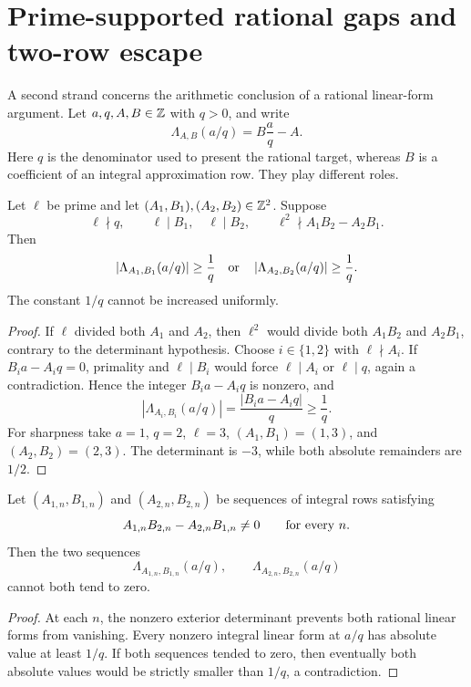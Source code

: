 \documentclass[11pt]{article}
\begin{document}
\section{Prime-supported rational gaps and two-row escape}
\label{sec:prime-support}

A second strand concerns the arithmetic conclusion of a rational linear-form
argument.  Let \(a,q,A,B\in\mathbb{Z}\) with \(q>0\), and
write
\[
  \Lambda_{A,B}(a/q)=B\frac aq-A .
\]
Here \(q\) is the denominator used to present the rational target, whereas
\(B\) is a coefficient of an integral approximation row.  They play different
roles.

\begin{theorem}
\label{res:prime-supported-two-selector-gap}
Let \(\ell\) be prime and let
\((A_1,B_1),(A_2,B_2)\in\mathbb{Z}^2\).  Suppose
\[
 \ell\nmid q,\qquad
 \ell\mid B_1,\quad \ell\mid B_2,\qquad
 \ell^2\nmid A_1B_2-A_2B_1 .
\]
Then
\[
 \left|\Lambda_{A_1,B_1}(a/q)\right|\ge\frac1q
 \quad\hbox{or}\quad
 \left|\Lambda_{A_2,B_2}(a/q)\right|\ge\frac1q .
\]
The constant \(1/q\) cannot be increased uniformly.
\end{theorem}

\begin{proof}
If \(\ell\) divided both \(A_1\) and \(A_2\), then \(\ell^2\) would divide
both \(A_1B_2\) and \(A_2B_1\), contrary to the determinant hypothesis.
Choose \(i\in\{1,2\}\) with \(\ell\nmid A_i\).  If
\(B_i a-A_iq=0\), primality and \(\ell\mid B_i\) would force
\(\ell\mid A_i\) or \(\ell\mid q\), again a contradiction.  Hence the
integer \(B_i a-A_iq\) is nonzero, and
\[
 \left|\Lambda_{A_i,B_i}(a/q)\right|
 =\frac{|B_i a-A_iq|}{q}\ge\frac1q .
\]
For sharpness take \(a=1\), \(q=2\), \(\ell=3\),
\((A_1,B_1)=(1,3)\), and \((A_2,B_2)=(2,3)\).  The determinant is \(-3\),
while both absolute remainders are \(1/2\).
\end{proof}

\begin{corollary}
\label{res:rational-two-selector-no-double-decay}
Let \((A_{1,n},B_{1,n})\) and \((A_{2,n},B_{2,n})\) be sequences of integral
rows satisfying
\[
 A_{1,n}B_{2,n}-A_{2,n}B_{1,n}\ne0
 \qquad\hbox{for every }n .
\]
Then the two sequences
\[
 \Lambda_{A_{1,n},B_{1,n}}(a/q),
 \qquad
 \Lambda_{A_{2,n},B_{2,n}}(a/q)
\]
cannot both tend to zero.
\end{corollary}

\begin{proof}
At each \(n\), the nonzero exterior determinant prevents both rational linear
forms from vanishing.  Every nonzero integral linear form at \(a/q\) has
absolute value at least \(1/q\).  If both sequences tended to zero, then
eventually both absolute values would be strictly smaller than \(1/q\), a
contradiction.
\end{proof}
\end{document}
